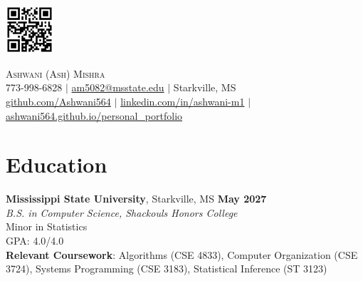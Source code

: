 \documentclass[letterpaper,10pt]{article} %
\begin{document}

\noindent %
\begin{minipage}[c]{0.7in} %
    \includegraphics[width=0.7in]{qr_code.png}
\end{minipage}
\hfill %
\begin{minipage}[c]{\dimexpr\textwidth-0.8in\relax} %
    \begin{center}
        {\Huge \scshape Ashwani (Ash) Mishra} \\ \vspace{1pt}
        \small 773-998-6828 $|$
        \href{mailto:am5082@msstate.edu}{am5082@msstate.edu} $|$
        Starkville, MS \\
        \href{https://github.com/Ashwani564}{github.com/Ashwani564} $|$
        \href{https://www.linkedin.com/in/ashwani-m1}{linkedin.com/in/ashwani-m1} $|$
        \href{https://ashwani564.github.io/personal_portfolio/}{ashwani564.github.io/personal\_portfolio}
    \end{center}
\end{minipage}
\vspace{0.1in} %



\section*{Education}

\textbf{Mississippi State University}, Starkville, MS \hfill \textbf{May 2027} \\
\textit{B.S. in Computer Science, Shackouls Honors College} \\
Minor in Statistics \\
GPA: 4.0/4.0 \\
\textbf{Relevant Coursework}: Algorithms (CSE 4833), Computer Organization (CSE 3724), Systems Programming (CSE 3183), Statistical Inference (ST 3123) %
\end{document}

